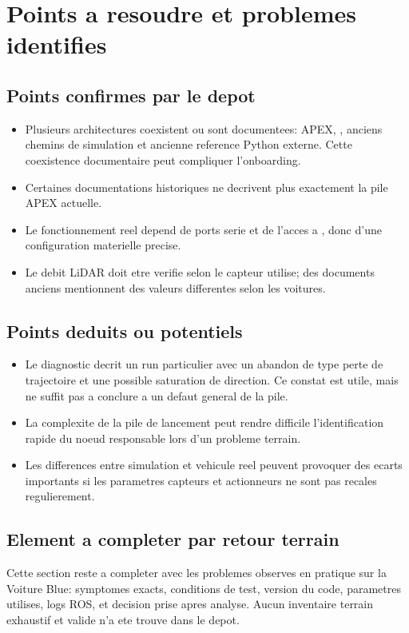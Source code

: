 \section{Points a resoudre et problemes identifies}

\subsection{Points confirmes par le depot}

\begin{itemize}
  \item Plusieurs architectures coexistent ou sont documentees: APEX, , anciens chemins de simulation et ancienne reference Python externe. Cette coexistence documentaire peut compliquer l'onboarding.
  \item Certaines documentations historiques ne decrivent plus exactement la pile APEX actuelle.
  \item Le fonctionnement reel depend de ports serie et de l'acces a , donc d'une configuration materielle precise.
  \item Le debit LiDAR doit etre verifie selon le capteur utilise; des documents anciens mentionnent des valeurs differentes selon les voitures.
\end{itemize}

\subsection{Points deduits ou potentiels}

\begin{itemize}
  \item Le diagnostic  decrit un run particulier avec un abandon de type perte de trajectoire et une possible saturation de direction. Ce constat est utile, mais ne suffit pas a conclure a un defaut general de la pile.
  \item La complexite de la pile de lancement peut rendre difficile l'identification rapide du noeud responsable lors d'un probleme terrain.
  \item Les differences entre simulation et vehicule reel peuvent provoquer des ecarts importants si les parametres capteurs et actionneurs ne sont pas recales regulierement.
\end{itemize}

\subsection{Element a completer par retour terrain}

Cette section reste a completer avec les problemes observes en pratique sur la Voiture Blue: symptomes exacts, conditions de test, version du code, parametres utilises, logs ROS, et decision prise apres analyse. Aucun inventaire terrain exhaustif et valide n'a ete trouve dans le depot.

